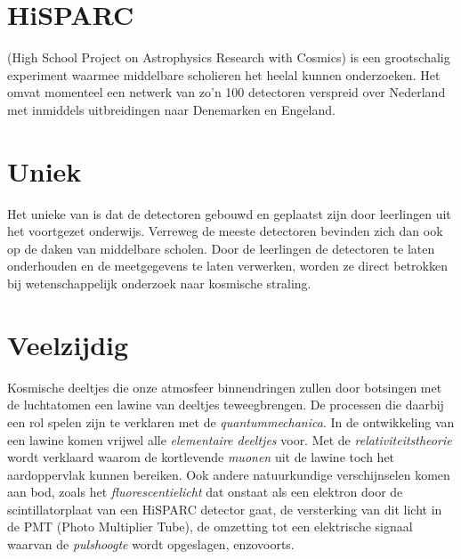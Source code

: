 



\date{}

\maketitle


\section{HiSPARC}

\hisparc (High School Project on Astrophysics Research with Cosmics) is
een grootschalig experiment waarmee middelbare scholieren het heelal
kunnen onderzoeken. Het omvat momenteel een netwerk van zo'n 100
detectoren verspreid over Nederland met inmiddels uitbreidingen naar
Denemarken en Engeland. 


\section{Uniek}

Het unieke van \hisparc is dat de detectoren gebouwd en geplaatst zijn
door leerlingen uit het voortgezet onderwijs. Verreweg de
meeste detectoren bevinden zich dan ook op de daken van middelbare
scholen. Door de leerlingen de detectoren te laten onderhouden en de
meetgegevens te laten verwerken, worden ze direct betrokken bij
wetenschappelijk onderzoek naar kosmische straling. 


\section{Veelzijdig}

Kosmische deeltjes die onze atmosfeer binnendringen zullen door
botsingen met de luchtatomen een lawine van deeltjes teweegbrengen. De
processen die daarbij een rol spelen zijn te verklaren met de
\emph{quantummechanica}. In de ontwikkeling van een lawine komen vrijwel
alle \emph{elementaire deeltjes} voor. Met de
\emph{relativiteitstheorie} wordt verklaard waarom de kortlevende
\emph{muonen} uit de lawine toch het aardoppervlak kunnen bereiken. Ook
andere natuurkundige verschijnselen komen aan bod, zoals het
\emph{fluorescentielicht} dat onstaat als een elektron door de
scintillatorplaat van een HiSPARC detector gaat, de versterking van dit
licht in de PMT (Photo Multiplier Tube), de omzetting tot een
elektrische signaal waarvan de \emph{pulshoogte} wordt opgeslagen,
enzovoorts.      


